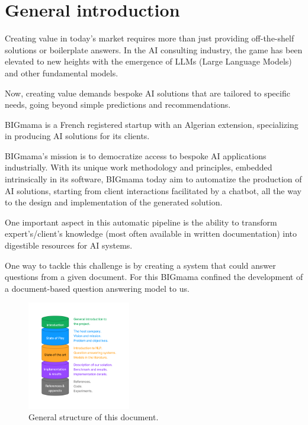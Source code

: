 \documentclass[a4paper,12pt]{article}
\begin{document}
\onecolumn
\tableofcontents
\listoffigures
\listoftables

\newpage
\printglossary[type=\acronymtype, title=List of acronyms]

\newpage

\section{General introduction}
Creating value in today's market requires more than just providing off-the-shelf solutions or boilerplate answers. 
In the AI consulting industry, the game has been elevated to new heights with the emergence of LLMs (Large Language Models) and other fundamental models. 

Now, creating value demands bespoke AI solutions that are tailored to specific needs, 
going beyond simple predictions and recommendations.

BIGmama is a French registered startup with an Algerian extension, 
specializing in producing AI solutions for its clients.

BIGmama's mission is to democratize access to bespoke AI applications industrially. 
With its unique work methodology and principles, embedded intrinsically in its software, BIGmama today aim
to automatize the production of AI solutions, starting from client interactions facilitated by a chatbot, 
all the way to the design and implementation of the generated solution.

One important aspect in this automatic pipeline is the ability to transform expert's/client's knowledge (most often available in written documentation) 
into digestible resources for AI systems.  

One way to tackle this challenge is by creating a system that could answer questions from a given document. 
For this BIGmama confined the development of a document-based question answering model to us.

\begin{figure}[h]
    \begin{center}
      \includegraphics[width=0.4\textwidth]{figures/plan.png}
    \end{center}
  \caption{General structure of this document.}
    \label{fig:plan}
\end{figure}
\end{document}
